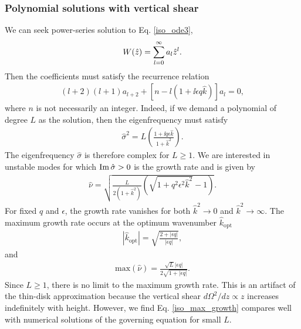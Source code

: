 \subsubsection{Polynomial solutions with vertical shear}\label{iso_poly}
We can seek power-series solution to Eq. \ref{iso_ode3},
\begin{align}
  W(\hat{z}) = \sum_{l=0}^\infty a_l\hat{z}^l. 
\end{align}
Then the coefficients must satisfy the recurrence relation
\begin{align}
  (l+2)(l+1)a_{l+2} +
  \left[n - l\left(1+\ii \epsilon q  \hat{k}\right)\right] a_l = 0, 
\end{align}
where $n$ is not necessarily an integer. Indeed, if we demand
a polynomial of degree $L$ as the solution, then the eigenfrequency
must satisfy
\begin{align}\label{sig2_iso}
\hat{\sigma}^2 = L\left(\frac{1+\ii q \epsilon
    \hat{k}}{1+\hat{k}^2}\right).
\end{align}
The eigenfrequency $\hat{\sigma}$ is therefore complex for
$L\geq1$. We are interested in 
unstable modes for which $\operatorname{Im}{\hat{\sigma}}>0$ is the growth rate and is
given by 
\begin{align}\label{simple_growth}
  \hat{\nu} =\sqrt{
   \frac{L}{2\left(1+\hat{k}^2\right)}\left(\sqrt{1+q^2\epsilon^2\hat{k}^2} - 
    1\right)}. 
\end{align}
For fixed $q$ and $\epsilon$, the growth rate vanishes for both
$\hat{k}^2\to0$ and $\hat{k}^2\to\infty$. The maximum growth rate
occurs at the optimum wavenumber $\hat{k}_\mathrm{opt}$
\begin{align}
  |\hat{k}_\mathrm{opt}| = \sqrt{\frac{2+|\epsilon q|}{|\epsilon q|}},
\end{align}
and
\begin{align}
  \mathrm{max}\left(\hat{\nu}\right) =\frac{\sqrt{L}|\epsilon
    q|}{2\sqrt{1+|\epsilon q|}}. \label{iso_max_growth}
\end{align}
Since $L\geq1$, there is no limit to the maximum growth rate. This is
an artifact of the thin-disk approximation because the vertical 
shear $d\Omega^2/dz\propto z$ increases indefinitely with
height. However, we find Eq. \ref{iso_max_growth} compares well with
numerical solutions of the governing equation for small $L$.      



